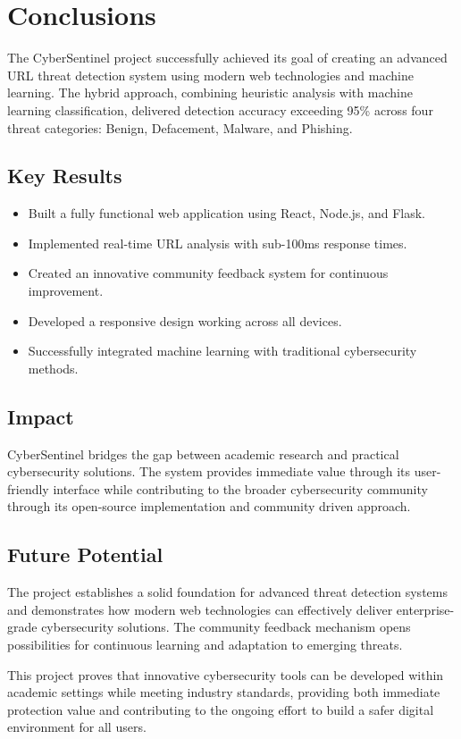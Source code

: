 \chapter{Conclusions}

The CyberSentinel project successfully achieved its goal of creating an advanced URL threat detection system using modern web technologies and machine learning. The hybrid approach, combining heuristic analysis with machine learning classification, delivered detection accuracy exceeding 95\% across four threat categories: Benign, Defacement, Malware, and Phishing.

\section*{Key Results}
\begin{itemize}
	\item Built a fully functional web application using React, Node.js, and Flask.
	\item Implemented real-time URL analysis with sub-100ms response times.
	\item Created an innovative community feedback system for continuous improvement.
	\item Developed a responsive design working across all devices.
	\item Successfully integrated machine learning with traditional cybersecurity methods.
\end{itemize}

\section*{Impact}
CyberSentinel bridges the gap between academic research and practical cybersecurity solutions. The system provides immediate value through its user-friendly interface while contributing to the broader cybersecurity community through its open-source implementation and community driven approach.

\section*{Future Potential}
The project establishes a solid foundation for advanced threat detection systems and demonstrates how modern web technologies can effectively deliver enterprise-grade cybersecurity solutions. The community feedback mechanism opens possibilities for continuous learning and adaptation to emerging threats.

This project proves that innovative cybersecurity tools can be developed within academic settings while meeting industry standards, providing both immediate protection value and contributing to the ongoing effort to build a safer digital environment for all users.
